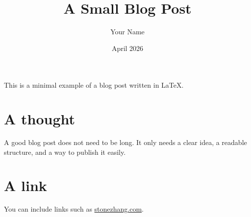 \documentclass[12pt]{article}
\title{A Small Blog Post}
\author{Your Name}
\date{April 2026}
\begin{document}
\maketitle

This is a minimal example of a blog post written in \LaTeX.

\section*{A thought}
A good blog post does not need to be long. It only needs a clear idea,
a readable structure, and a way to publish it easily.

\section*{A link}
You can include links such as \href{https://stonezhang.com}{stonezhang.com}.
\end{document}
